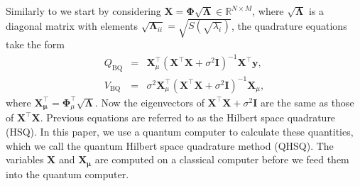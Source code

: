 \documentclass[10pt]{article}
\begin{document}
	Similarly to \citet{Farooq2024QAHSGPR} we start by considering $\mathbf{X} = \boldsymbol{\Phi}\sqrt{\boldsymbol{\Lambda}}\in \mathbb{R}^{N\times M}$, where $\sqrt{\boldsymbol{\Lambda}}$ is a diagonal matrix with elements $\sqrt{\boldsymbol{\Lambda}_{ii}} = \sqrt{S(\sqrt{\lambda_i})}$, the quadrature equations  take the form
	\begin{eqnarray} \label{mean:1}
		Q_{\mathrm{BQ}}&=&\mathbf{X}_\mu^{\top}\left(\mathbf{X}^{\top}\mathbf{X}+
		\sigma^{2} \mathbf{I}\right)^{-1}\mathbf{X}^{\top}  \mathbf{y},\\ \label{varianve:1}
		V_{\mathrm{BQ}}&=&\sigma^{2} \mathbf{X}_\mu^{\top}\left(\mathbf{X}^{\top}\mathbf{X}+\sigma^{2} \mathbf{I} \right)^{-1} \mathbf{X}_\mu,
	\end{eqnarray}
	where $\mathbf{X_\mu^{\top}} = \boldsymbol{\Phi}_\mu^{\top} \sqrt{\boldsymbol{\Lambda}}$. Now the eigenvectors of $\mathbf{X}^{\top}\mathbf{X}+\sigma^{2} \mathbf{I}$ are the same as those of $\mathbf{X}^{\top}\mathbf{X}$. Previous equations are referred to as the Hilbert space quadrature (HSQ). In this paper, we use a quantum computer to calculate these quantities, which we call the quantum Hilbert space quadrature method (QHSQ).  The variables $\mathbf{X}$ and $\mathbf{X_\mu}$ are computed on a classical computer before we feed them into the quantum computer.
	
\end{document}
